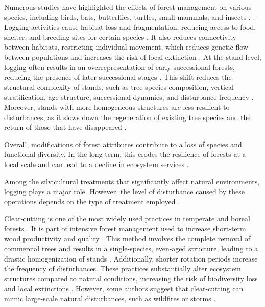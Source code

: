 Numerous studies have highlighted the effects of forest management on various species, including birds, bats, butterflies, turtles, small mammals, and insects \citep{Summerville2011Managingforest,Currylow2012ShortTermForest,Kaminski2013EffectsForest,Kellner2013Shorttermresponses,Caldwell2019ComparisonBat}. .
Logging activities cause habitat loss and fragmentation, reducing access to food, shelter, and breeding sites for certain species \citep{Bouderbala2023Longtermeffect}. 
It also reduces connectivity between habitats, restricting individual movement, which reduces genetic flow between populations and increases the risk of local extinction \citep{Saccheri1998Inbreedingextinction}. 
At the stand level, logging often results in an overrepresentation of early-successional forests, reducing the presence of later successional stages \citep{Cyr2009Forestmanagement,Boucher2017Cumulativepatterns}. 
This shift reduces the structural complexity of stands, such as tree species composition, vertical stratification, age structure, successional dynamics, and disturbance frequency \citep{Commarmot2005Structurevirgin}. 
Moreover, stands with more homogeneous structures are less resilient to disturbances, as it slows down the regeneration of existing tree species and the return of those that have disappeared \citep{Kuuluvainen2009Forestmanagement}. 

Overall, modifications of forest attributes contribute to a loss of species and functional diversity. 
In the long term, this erodes the resilience of forests at a local scale and can lead to a decline in ecosystem services \citep{Hooper2012globalsynthesis,Edwards2014Maintainingecosystem}.


%

Among the silvicultural treatments that significantly affect natural environments, logging plays a major role. 
However, the level of disturbance caused by these operations depends on the type of treatment employed \citep{Ameray2021Forestcarbon}. 

Clear-cutting is one of the most widely used practices in temperate and boreal forests \citep{Fedrowitz2014Canretention,Chaudhary2016Impactforest}. 
It is part of intensive forest management used to increase short-term wood productivity and quality \citep{Irland2011TimberProductivitya}.
This method involves the complete removal of commercial trees and results in a single-species, even-aged structure, leading to a drastic homogenization of stands \citep{Rosenvald2008whatwhen}. 
Additionally, shorter rotation periods increase the frequency of disturbances. 
These practices substantially alter ecosystem structures compared to natural conditions, increasing the risk of biodiversity loss and local extinctions \citep{Hanski2000Extinctiondebt}. 
However, some authors suggest that clear-cutting can mimic large-scale natural disturbances, such as wildfires or storms \citep{Greenberg1995comparisonbird}. 


